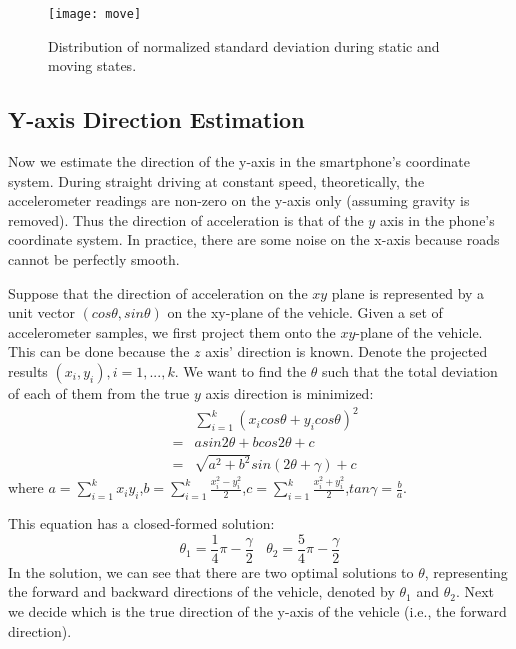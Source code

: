 \begin{figure}[h]
  \centering
  \texttt{[image: move]}\\
  \caption{Distribution of normalized standard deviation during static and moving states. }\label{pix:move}
\end{figure}

\subsection{Y-axis Direction Estimation} \label{subsec:pose_undirected}
Now we estimate the direction of the y-axis in the smartphone's coordinate system. During straight driving at constant speed, theoretically, the accelerometer readings are non-zero on the y-axis only (assuming gravity is removed). Thus the direction of acceleration is that of the $y$ axis in the phone's coordinate system. In practice, there are some noise on the x-axis because roads cannot be perfectly smooth.

Suppose that the direction of acceleration on the $xy$ plane is represented by a unit vector ${(cos\theta, sin\theta)}$ on the xy-plane of the vehicle. Given a set of accelerometer samples, we first project them onto the $xy$-plane of the vehicle. This can be done because the $z$ axis' direction is known. Denote the projected results ${(x_i,y_i), i = 1,...,k}$. We want to find the $\theta$ such that the total deviation of each of them from the true $y$ axis direction is minimized:
\begin{eqnarray}
&&\sum_{i=1}^{k}(x_icos\theta + y_icos\theta)^2\\
&=&asin2\theta + bcos2\theta + c\\
&=&\sqrt{a^2+b^2}sin(2\theta + \gamma) + c
\end{eqnarray}
where ${a=\sum_{i=1}^{k}x_i y_i}$,${b=\sum_{i=1}^{k}\frac{x_i^2-y_i^2}{2}}$,${c=\sum_{i=1}^{k}\frac{x_i^2+y_i^2}{2}}$,${tan\gamma=\frac{b}{a}}$.

This equation has a closed-formed solution:
\begin{equation}
\theta_1 = \frac{1}{4}\pi -  \frac{\gamma}{2}~~~~\theta_2 = \frac{5}{4}\pi - \frac{\gamma}{2}
\end{equation}
In the solution, we can see that there are two optimal solutions to ${\theta}$, representing the forward and backward directions of the vehicle, denoted by $\theta_1$ and $\theta_2$. Next we decide which is the true direction of the y-axis of the vehicle (i.e., the forward direction).

